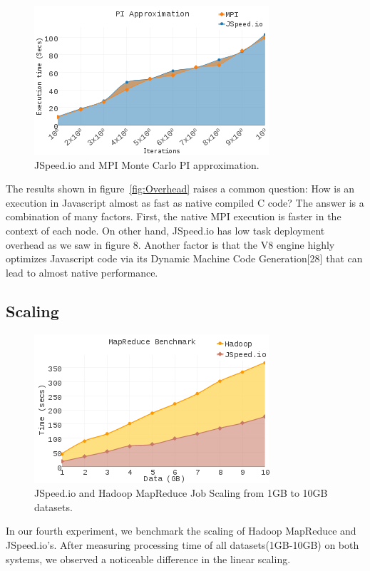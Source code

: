 \documentclass[10pt,reprint]{socc14}
\begin{document}
\begin{figure}	
	\centering
	\includegraphics[scale=3.0]{PI_Approximation} %
	\caption{JSpeed.io and MPI Monte Carlo PI approximation.}
	\label{fig:PI}
\end{figure}

The results shown in figure~\ref{fig:Overhead} raises a common question: How is an execution in Javascript almost as fast as native compiled C code? The answer is a combination of many factors. First, the native MPI execution is faster in the context of each node. On other hand, JSpeed.io has low task deployment overhead as we saw in figure 8. Another factor is that the V8 engine highly optimizes Javascript code via its Dynamic Machine Code Generation[28] that can lead to almost native performance.


\subsection{Scaling}
\begin{figure}[h]	
	\centering
	\includegraphics[scale=3.0]{MapReduce_Benchmark}
	\caption{JSpeed.io and Hadoop MapReduce Job Scaling from 1GB to 10GB datasets.}
	\label{fig:JobScaling}
\end{figure}

In our fourth experiment, we benchmark the scaling of Hadoop MapReduce and JSpeed.io’s. After measuring processing time of all datasets(1GB-10GB) on both systems, we observed a noticeable difference in the linear scaling.
\end{document}
